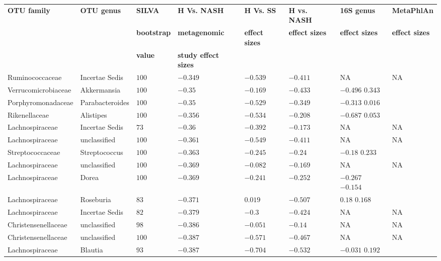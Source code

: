 \begin{table}[!ht]
\begin{tiny}
\begin{tabular}{|l|l|l|l|l|l|l|l|}
\hline
\bf{OTU family} & \bf{OTU genus} & \bf{SILVA} &\bf{H Vs. NASH} & \bf{H Vs. SS} & \bf{H vs. NASH} & \bf{16S genus} & \bf{MetaPhlAn}\\
& & \bf{bootstrap} & \bf{metagenomic} & \bf{effect sizes} & \bf{effect sizes} & \bf{effect sizes} & \bf{effect sizes}\\
& & \bf{value} & \bf{study effect sizes} & & & & \\ \hline
Ruminococcaceae & Incertae Sedis & $100$ & $-0.349$ & $-0.539$ & $-0.411$ & NA & NA \\ \hline
Verrucomicrobiaceae & Akkermansia & $100$ & $-0.35$ & $-0.169$ & $-0.433$ & $-0.496$ $0.343$ & \\ \hline
Porphyromonadaceae & Parabacteroides & $100$ & $-0.35$ & $-0.529$ & $-0.349$ & $-0.313$ $0.016$ & \\ \hline
Rikenellaceae & Alistipes & $100$ & $-0.356$ & $-0.534$ & $-0.208$ & $-0.687$ $0.053$ & \\ \hline
Lachnospiraceae & Incertae Sedis & $73$ & $-0.36$ & $-0.392$ & $-0.173$ & NA & NA \\ \hline
Lachnospiraceae & unclassified & $100$ & $-0.361$ & $-0.549$ & $-0.411$ & NA & NA \\ \hline
Streptococcaceae & Streptococcus & $100$ & $-0.363$ & $-0.245$ & $-0.24$ & $-0.18$ $0.233$ & \\ \hline
Lachnospiraceae & unclassified & $100$ & $-0.369$ & $-0.082$ & $-0.169$ & NA & NA \\ \hline
Lachnospiraceae & Dorea & $100$ & $-0.369$ & $-0.241$ & $-0.252$ & $-0.267$ $-0.154$ & \\ \hline
Lachnospiraceae & Roseburia & $83$ & $-0.371$ & $0.019$ & $-0.507$ & $0.18$ $0.168$ & \\ \hline
Lachnospiraceae & Incertae Sedis & $82$ & $-0.379$ & $-0.3$ & $-0.424$ & NA & NA \\ \hline
Christensenellaceae & unclassified & $98$ & $-0.386$ & $-0.051$ & $-0.14$ & NA & NA \\ \hline
Christensenellaceae & unclassified & $100$ & $-0.387$ & $-0.571$ & $-0.467$ & NA & NA \\ \hline
Lachnospiraceae & Blautia & $93$ & $-0.387$ & $-0.704$ & $-0.532$ & $-0.031$ $0.192$ & \\ \hline

\end{tabular}
\end{tiny}
\end{table}
